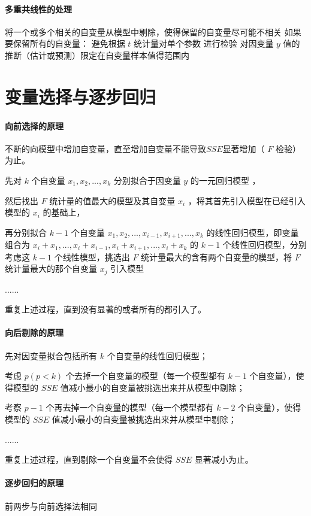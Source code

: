 \documentclass[UTF8,10pt]{book}
\begin{document}
\paragraph{多重共线性的处理}	将一个或多个相关的自变量从模型中剔除，使得保留的自变量尽可能不相关 如果要保留所有的自变量： 避免根据 $t$ 统计量对单个参数 进行检验 对因变量 $y$ 值的推断（估计或预测）限定在自变量样本值得范围内

\section{变量选择与逐步回归}

\paragraph{向前选择的原理}	不断的向模型中增加自变量，直至增加自变量不能导致$SSE$显著增加（ $F$ 检验）为止。 

先对 $k$ 个自变量 $ x_1,x_2,...,x_k$ 分别拟合于因变量 $y$ 的一元回归模型 ，

然后找出 $F$ 统计量的值最大的模型及其自变量 $x_i$ ，将其首先引入模型在已经引入模型的 $x_i$ 的基础上，

再分别拟合 $k-1$ 个自变量 $ x_1,x_2,...,x_{i-1},x_{i+1},...,x_{k}$ 的线性回归模型，即变量组合为 $x_i + x_1,...,x_i + x_{i-1},x_i + x_{i+1},...,x_i + x_{k}$ 的 $k-1$ 个线性回归模型，分别考虑这 $k-1$ 个线性模型，挑选出 $F$ 统计量最大的含有两个自变量的模型，将 $F$ 统计量最大的那个自变量 $x_j $ 引入模型

......

重复上述过程，直到没有显著的或者所有的都引入了。

\paragraph{向后剔除的原理}	先对因变量拟合包括所有 $k$ 个自变量的线性回归模型；

考虑 $p(p<k)$ 个去掉一个自变量的模型（每一个模型都有 $k-1$ 个自变量），使得模型的 $SSE$ 值减小最小的自变量被挑选出来并从模型中剔除；

考察 $p-1$ 个再去掉一个自变量的模型（每一个模型都有 $k-2$ 个自变量），使得模型的 $SSE$ 值减小最小的自变量被挑选出来并从模型中剔除；

......

重复上述过程，直到剔除一个自变量不会使得 $SSE$ 显著减小为止。

\paragraph{逐步回归的原理}	前两步与向前选择法相同
\end{document}
